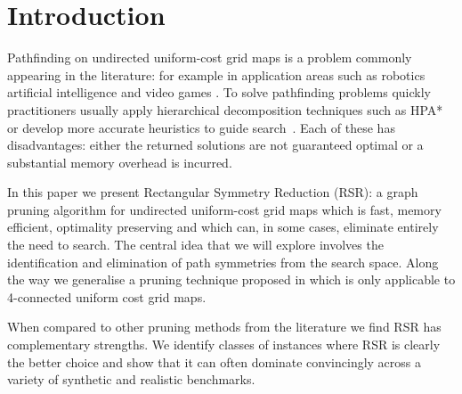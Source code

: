 \section{Introduction}
\label{sec:introduction}
Pathfinding on undirected uniform-cost grid maps is a problem commonly appearing in
the literature: for example in application areas such as robotics \cite{lee09}
artificial intelligence \cite{wang09} and video games \cite{davis00,sturtevant10}.  
To solve pathfinding problems quickly practitioners usually apply
hierarchical decomposition techniques such as HPA* \cite{botea04,sturtevant10} or 
develop more accurate heuristics to guide search~\cite{bjornsson06,sturtevant09,goldenberg10}.  
Each of these has disadvantages: either the returned solutions are
not guaranteed optimal or a substantial memory overhead is incurred.
\par
In this paper we present Rectangular Symmetry Reduction (RSR): a graph pruning
algorithm for undirected uniform-cost grid maps which is fast, memory efficient,
optimality preserving and which can, in some cases, eliminate entirely the need
to search.  
The central idea that we will explore involves the identification
and elimination of path symmetries from the search space. 
Along the way we generalise a pruning technique proposed in \cite{harabor10} 
which is only applicable to 4-connected uniform cost grid maps.
\par
When compared to other pruning methods from the literature we
find RSR has complementary strengths. We identify classes of instances
where RSR is clearly the better choice and show that it can often dominate convincingly
across a variety of synthetic and realistic benchmarks.

%
